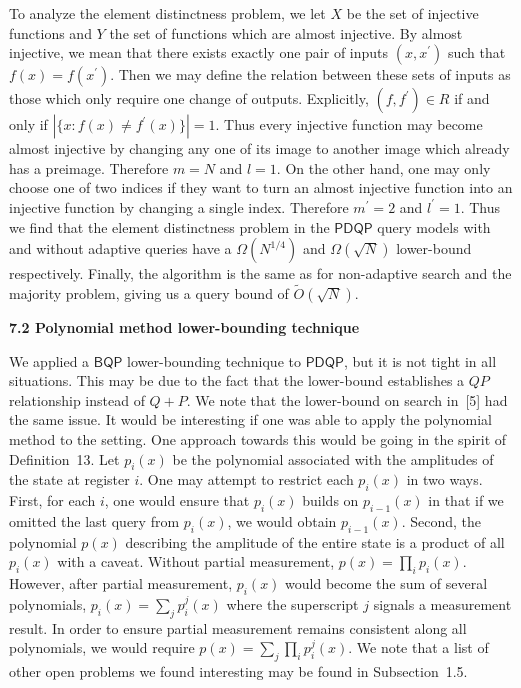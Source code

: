 \documentclass[10pt,a4paper]{article}
\begin{document}
To analyze the element distinctness problem, we let $X$ be the set of injective functions and $Y$ the set of functions which are almost injective. By almost injective, we mean that there exists exactly one pair of inputs $(x,x^{\prime})$ such that $f(x)=f(x^{\prime})$. Then we may define the relation between these sets of inputs as those which only require one change of outputs. Explicitly, $(f,f^{\prime})\in R$ if and only if $|\{x:f(x)\neq f^{\prime}(x)\}|=1$. Thus every injective function may become almost injective by changing any one of its image to another image which already has a preimage. Therefore $m=N$ and $l=1$. On the other hand, one may only choose one of two indices if they want to turn an almost injective function into an injective function by changing a single index. Therefore $m^{\prime}=2$ and $l^{\prime}=1$. Thus we find that the element distinctness problem in the $\mathsf{PDQP}$ query models with and without adaptive queries have a $\Omega(N^{1/4})$ and $\Omega(\sqrt{N})$ lower-bound respectively. Finally, the algorithm is the same as for non-adaptive search and the majority problem, giving us a query bound of $\tilde{O}(\sqrt{N})$.\par






\par\medskip\noindent\textbf{
7.2 Polynomial method lower-bounding technique}\par




We applied a $\mathsf{BQP}$ lower-bounding technique to $\mathsf{PDQP}$, but it is not tight in all situations. This may be due to the fact that the lower-bound establishes a $QP$ relationship instead of $Q+P$. We note that the lower-bound on search in [5] had the same issue. It would be interesting if one was able to apply the polynomial method to the setting. One approach towards this would be going in the spirit of Definition 13. Let $p_{i}(x)$ be the polynomial associated with the amplitudes of the state at register $i$. One may attempt to restrict each $p_{i}(x)$ in two ways. First, for each $i$, one would ensure that $p_{i}(x)$ builds on $p_{i-1}(x)$ in that if we omitted the last query from $p_{i}(x)$, we would obtain $p_{i-1}(x)$. Second, the polynomial $p(x)$ describing the amplitude of the entire state is a product of all $p_{i}(x)$ with a caveat. Without partial measurement, $p(x)=\prod_{i}p_{i}(x)$. However, after partial measurement, $p_{i}(x)$ would become the sum of several polynomials, $p_{i}(x)=\sum_{j}p_{i}^{j}(x)$ where the superscript $j$ signals a measurement result. In order to ensure partial measurement remains consistent along all polynomials, we would require $p(x)=\sum_{j}\prod_{i}p_{i}^{j}(x)$. We note that a list of other open problems we found interesting may be found in Subsection 1.5.\par
\end{document}
